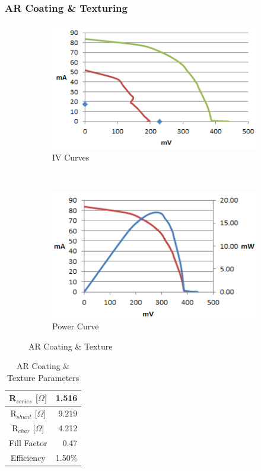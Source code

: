 \documentclass[letter,12pt]{article}
\begin{document}
		\FloatBarrier
		\subsubsection{AR Coating \& Texturing}
		
			\begin{figure}[h!]
				\centering
				\begin{subfigure}[b]{.45\textwidth}
					\includegraphics[width=\textwidth]{./Images/IV_Curves/Alt_Both_IV.png}
					\caption{IV Curves}
				\end{subfigure}
				~
				\begin{subfigure}[b]{.45\textwidth}
					\includegraphics[width=\textwidth]{./Images/IV_Curves/Alt_Both_PV.png}
					\caption{Power Curve}
				\end{subfigure}
				
				\caption{AR Coating \& Texture}
				\label{fig:Alt_Both}
			\end{figure}
			
			\begin{table}[h!]
				\centering
				\begin{tabular}{|c | r|}
					\hline
					R$_{series}$ [$\Omega$] & 1.516 \\
					\hline
					R$_{shunt}$ [$\Omega$] & 9.219 \\
					\hline
					R$_{char}$ [$\Omega$] & 4.212 \\
					\hline
					Fill Factor & 0.47 \\
					\hline
					Efficiency & 1.50\% \\
					\hline
				\end{tabular}
				\caption{AR Coating \& Texture Parameters}
			\end{table}
	
\end{document}
